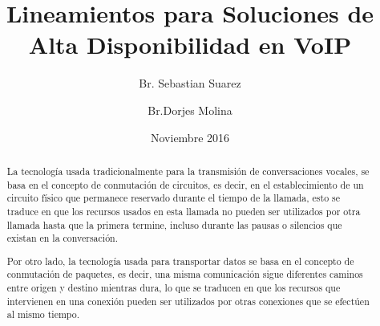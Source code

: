 \documentclass[12pt]{article}
\title{Lineamientos para Soluciones de Alta Disponibilidad en VoIP}
\author{Br. Sebastian Suarez \and
		Br.Dorjes Molina}
\date{Noviembre 2016}
\begin{document}
	\maketitle
	\newpage
	\begin{abstract}
		\item
		La tecnolog\'ia usada tradicionalmente para la transmisi\'on
		de conversaciones vocales, se basa en el concepto de conmutaci\'on 
		de circuitos, es decir, en el establecimiento de un circuito f\'isico 
		que permanece reservado durante el tiempo de la llamada, esto se 
		traduce en que los recursos usados en esta llamada no pueden ser 
		utilizados por otra llamada hasta que la primera termine, incluso 
		durante las pausas o silencios que existan en la conversaci\'on.
		
		
		
		Por otro lado, la tecnolog\'ia usada para transportar datos se basa 
		en el concepto de conmutaci\'on de paquetes, es decir, una misma 
		comunicaci\'on sigue diferentes caminos entre origen y destino
		mientras dura, lo que se traducen en que los recursos que intervienen 
		en una conexi\'on pueden ser utilizados por otras conexiones que se 
		efect\'uen al mismo tiempo.
		
	\end{abstract}
\end{document}
